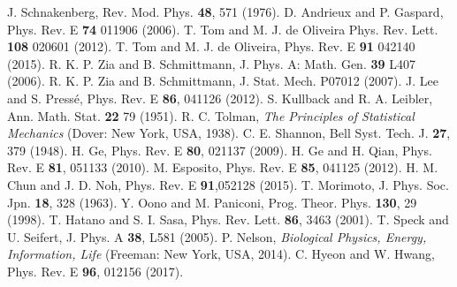 \documentclass[aps,pre,amsmath,amssymb,floatfix,preprint,nofootinbib]{revtex4}
\begin{document}
\begin{thebibliography}{}
J. Schnakenberg,  Rev. Mod. Phys. \textbf{48}, 571 (1976).
D. Andrieux and P. Gaspard, Phys. Rev. E \textbf{74} 011906 (2006).
T. Tom and M. J. de Oliveira Phys. Rev. Lett. \textbf{108} 020601 (2012).
T. Tom and M. J. de Oliveira, Phys. Rev. E \textbf{91} 042140 (2015).
R. K. P. Zia  and B. Schmittmann, J. Phys. A: Math. Gen. \textbf{39} L407 (2006).
R. K. P. Zia and B. Schmittmann, J. Stat. Mech. P07012 (2007).
 J. Lee and S. Press\'e,  Phys. Rev. E \textbf{86},  041126 (2012).
 S. Kullback and R. A. Leibler, Ann.  Math. Stat. \textbf{22} 79 (1951).
  R. C. Tolman, {\it The Principles of Statistical Mechanics} (Dover: New York, USA, 1938).
C. E. Shannon,  Bell Syst. Tech. J. \textbf{27}, 379 (1948).
  H. Ge, Phys. Rev. E \textbf{80}, 021137 (2009). 
 H. Ge and H. Qian, Phys. Rev. E \textbf{81}, 051133 (2010).
  M. Esposito, Phys. Rev. E \textbf{85}, 041125 (2012).
 H. M. Chun and J. D. Noh, Phys. Rev. E  \textbf{91},052128 (2015).
 T. Morimoto, J. Phys. Soc. Jpn. \textbf{18}, 328 (1963). 
 Y. Oono and M. Paniconi,  Prog. Theor. Phys. \textbf{ 130}, 29 (1998). 
 T. Hatano and S. I. Sasa,  Phys. Rev. Lett. \textbf{86}, 3463 (2001).
 T. Speck and U. Seifert,  J. Phys. A \textbf{38}, L581 (2005). 
  P. Nelson,  {\it Biological Physics, Energy, Information, Life} (Freeman: New York, USA, 2014).
 C. Hyeon and W. Hwang,  Phys. Rev. E \textbf{96}, 012156 (2017).
\end{thebibliography}

\appendix
\end{document}
